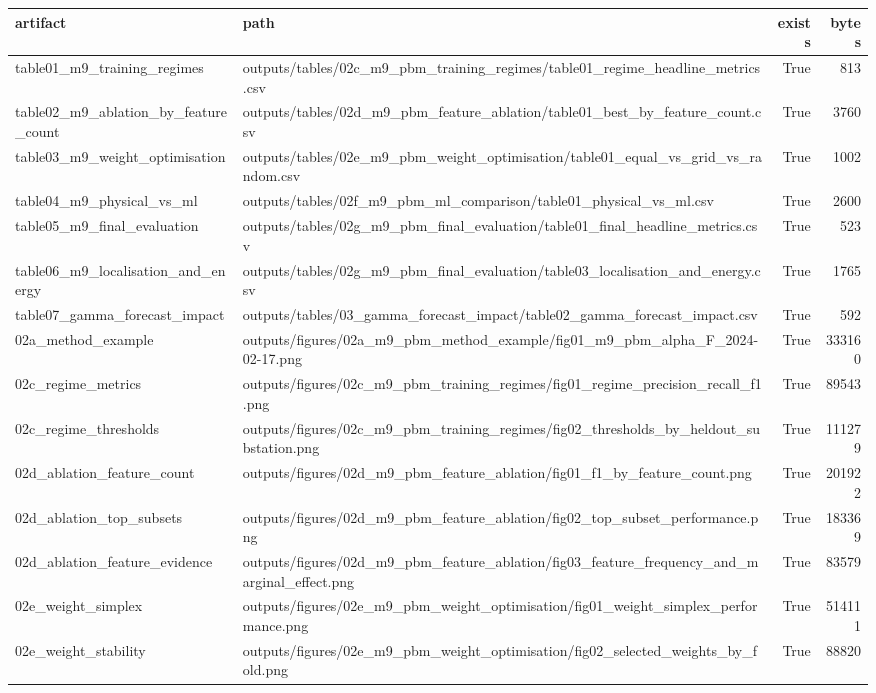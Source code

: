\begin{tabular}{llrr}
\toprule
artifact & path & exists & bytes \\
\midrule
table01_m9_training_regimes & outputs/tables/02c_m9_pbm_training_regimes/table01_regime_headline_metrics.csv & True & 813 \\
table02_m9_ablation_by_feature_count & outputs/tables/02d_m9_pbm_feature_ablation/table01_best_by_feature_count.csv & True & 3760 \\
table03_m9_weight_optimisation & outputs/tables/02e_m9_pbm_weight_optimisation/table01_equal_vs_grid_vs_random.csv & True & 1002 \\
table04_m9_physical_vs_ml & outputs/tables/02f_m9_pbm_ml_comparison/table01_physical_vs_ml.csv & True & 2600 \\
table05_m9_final_evaluation & outputs/tables/02g_m9_pbm_final_evaluation/table01_final_headline_metrics.csv & True & 523 \\
table06_m9_localisation_and_energy & outputs/tables/02g_m9_pbm_final_evaluation/table03_localisation_and_energy.csv & True & 1765 \\
table07_gamma_forecast_impact & outputs/tables/03_gamma_forecast_impact/table02_gamma_forecast_impact.csv & True & 592 \\
02a_method_example & outputs/figures/02a_m9_pbm_method_example/fig01_m9_pbm_alpha_F_2024-02-17.png & True & 333160 \\
02c_regime_metrics & outputs/figures/02c_m9_pbm_training_regimes/fig01_regime_precision_recall_f1.png & True & 89543 \\
02c_regime_thresholds & outputs/figures/02c_m9_pbm_training_regimes/fig02_thresholds_by_heldout_substation.png & True & 111279 \\
02d_ablation_feature_count & outputs/figures/02d_m9_pbm_feature_ablation/fig01_f1_by_feature_count.png & True & 201922 \\
02d_ablation_top_subsets & outputs/figures/02d_m9_pbm_feature_ablation/fig02_top_subset_performance.png & True & 183369 \\
02d_ablation_feature_evidence & outputs/figures/02d_m9_pbm_feature_ablation/fig03_feature_frequency_and_marginal_effect.png & True & 83579 \\
02e_weight_simplex & outputs/figures/02e_m9_pbm_weight_optimisation/fig01_weight_simplex_performance.png & True & 514111 \\
02e_weight_stability & outputs/figures/02e_m9_pbm_weight_optimisation/fig02_selected_weights_by_fold.png & True & 88820 \\

\end{tabular}
